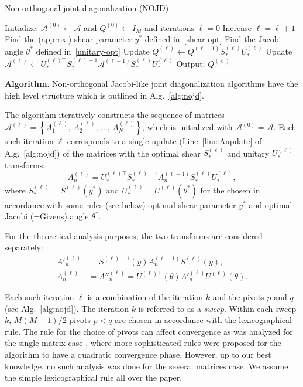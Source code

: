 \documentclass{article}
\newcommand{\cbra}[1]{\left\{#1\right\}}
\newcommand{\acal}{\mathcal{A}}
\begin{document}
\begin{algorithm}[!ht]
   \caption{Non-orthogonal joint diagonalization (NOJD)}
   \label{alg:nojd}
\begin{algorithmic}[1]
	\STATE Initialize: $\acal^{(0)}\leftarrow \acal$ and $Q^{(0)} \leftarrow I_M$ and iterations $\ell=0$
			    \STATE Increase $\ell= \ell + 1$
				\STATE Find the (approx.) shear parameter $y^*$ defined in~\eqref{shear-opt} 
				\STATE Find the Jacobi angle $\theta^*$ defined in~\eqref{unitary-opt} 
				\STATE Update $Q^{(\ell)} \leftarrow Q^{(\ell-1)}S^{(\ell)}_{*}U_*^{(\ell)}$
				\STATE Update $\acal^{(\ell)} \leftarrow U^{(\ell)\top}_{*}S^{(\ell)-1}_{*} \acal^{(\ell-1)} S^{(\ell)}_{*}U^{(\ell)}_{*}$ \label{line:Aupdate}
			\ENDFOR
		\ENDFOR
	\ENDFOR
	\STATE Output: $Q^{(\ell)}$
\end{algorithmic}
\end{algorithm}


\textbf{Algorithm}. Non-orthogonal {J}acobi-like joint diagonalization algorithms have the high level structure which is outlined in Alg.~\ref{alg:nojd}.


The algorithm iteratively constructs the sequence of matrices $\acal^{(\ell)}=\cbra{A_1^{(\ell)},\,A_2^{(\ell)},\,\dots,\,A_N^{(\ell)}}$, which is initialized with $\acal^{(0)}=\acal$. Each such iteration $\ell$ corresponds to a single update (Line~\eqref{line:Aupdate} of Alg.~\eqref{alg:nojd}) of the matrices with the optimal shear $S^{(\ell)}_{*}$ and unitary $U^{(\ell)}_{*}$ transforms:
$$
A_n^{(\ell)} = U^{(\ell)\top}_{*} S^{(\ell)-1}_{*} A_n^{(\ell-1)} S^{(\ell)}_{*}U^{(\ell)}_{*},
$$
where $S^{(\ell)}_{*}=S^{(\ell)}(y^*)$ and $U^{(\ell)}_{*}=U^{(\ell)}(\theta^*)$ for the chosen in accordance with some rules (see below) optimal shear parameter $y^*$ and optimal Jacobi (=Givens) angle $\theta^*$.

For the theoretical analysis purposes, the two transforms are considered separately:
\begin{equation}\label{Aprimes}
\begin{aligned}
A'^{(\ell)}_n &= S^{(\ell)-1}(y) A^{(\ell-1)}_n S^{(\ell)}(y), \\
A^{(\ell)}_n & = A''^{(\ell)}_n = U^{(\ell)\top}(\theta) A'^{(\ell)}_n U^{(\ell)}(\theta).
\end{aligned}
\end{equation}

Each such iteration $\ell$ is a combination of the iteration $k$ and the pivots $p$ and $q$ (see Alg.~\ref{alg:nojd}). The iteration $k$ is referred to as a \emph{sweep}. Within each sweep $k$, $M(M-1)/2$ pivots $p<q$ are chosen in accordance with the lexicographical rule. The rule for the choice of pivots can affect convergence as was analyzed for the single matrix case \citep[see, e.g.,][]{Ruh1968,Ebe1962}, where more sophisticated rules were proposed for the algorithm to have a quadratic convergence phase. However, up to our best knowledge, no such analysis was done for the several matrices case. We assume the simple lexicographical rule all over the paper.
\end{document}
